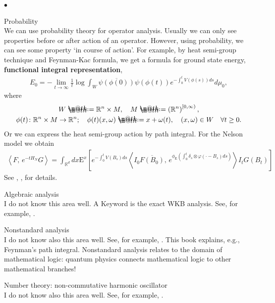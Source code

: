 \documentclass[openany, a4paper, oneside]{jsbook}
\makeatletter
\newcounter{enum2}
\renewenvironment{itemize}{%
\begin{list}{$\bullet$\ \ }%
{%
\usecounter{enum2}
\setlength{\itemindent}{0pt}%
\setlength{\leftmargin}{15pt}%
\setlength{\rightmargin}{0pt}%
\setlength{\labelsep}{0pt}%
\setlength{\labelwidth}{6pt}%
\setlength{\itemsep}{0pt}%
\setlength{\parsep}{0pt}%
\setlength{\listparindent}{0pt}%
}
}{%
\end{list}%
}
\newcommand*{\defeq}{\mathrel{\rlap{%
\raisebox{0.3ex}{$\m@th\cdot$}}%
\raisebox{-0.3ex}{$\m@th\cdot$}}%
=}
\theoremstyle{break}
\theoremstyle{breakdefn}
\newcommand{\rbk}[1]{\left (#1\right)}
\newcommand{\sqbk}[1]{\left[#1\right]}
\newcommand{\bkt}[2]{\left\langle#1,\,#2\right\rangle}
\newcommand{\bbRd}{\mathbb{R}^d}
\newcommand{\bbRn}{\mathbb{R}^n}
\newcommand{\rmE}{\mathrm{E}}
\makeatother
\begin{document}
\begin{itemize}
\item Probability\\
%
We can use probability theory for operator analysis.
Usually we can only see properties before or after action of an operator.
However, using probability, we can see some property `in course of action'.
For example, by heat semi-group technique and Feynman-Kac formula, we get a formula for ground state energy,
\textbf{functional integral representation},
\begin{align}
 E_0
 =
 -\lim_{t \to \infty} \frac{1}{t} \log \int_{W} \overline{\psi \rbk{\phi (0)}} \psi \rbk{\phi (t)} e^{- \int_0^t V (\phi (s)) ds} d\mu_0,
\end{align}
where
\begin{gather}
 W
 \defeq
 \bbRn \times M, \quad
 M
 \defeq
 \rbk{\bbRn}^{[0, \infty)}, \\
 \phi (t) \colon \bbRn \times M \to \bbRn; \quad
 \phi (t) (x, \omega) \defeq x + \omega (t), \quad (x, \omega) \in W \quad \forall t \geq 0.
\end{gather}
Or we can express the heat semi-group action by path integral.
For the Nelson model we obtain
\begin{align}
 \bkt{F}{e^{- t H_N} G}
 =
 \int_{\bbRd} dx \rmE^{x}
 \sqbk{e^{- \int_0^t V (B_s) ds} \bkt{I_0 \overline{F (B_0)}}{e^{\phi_{\mathrm{E}} \rbk{\int_0^t \delta_s \otimes \varphi (\cdot - B_s) ds}}}{I_t G (B_t)}}
\end{align}
See \cite{LorincziHiroshimaBetz1}, \cite{AsaoArai5}, \cite{SimonBarry2} for details.

\item Algebraic analysis\\
%
I do not know this area well.
A Keyword is the exact WKB analysis.
See, for example, \cite{KawaiTakei1}.

\item Nonstandard analysis\\
%
I do not know also this area well.
See, for example, \cite{TohruNakamura1}.
This book explains, e.g., Feynman's path integral.
Nonstandard analysis relates to the domain of mathematical logic:
quantum physics connects mathematical logic to other mathematical branches!

\item Number theory: non-commutative harmonic oscillator\\
%
I do not know also this area well.
See, for example, \cite{AlbertoParmeggiani1, MasatoWakayama1}.


\end{itemize}
\end{document}
